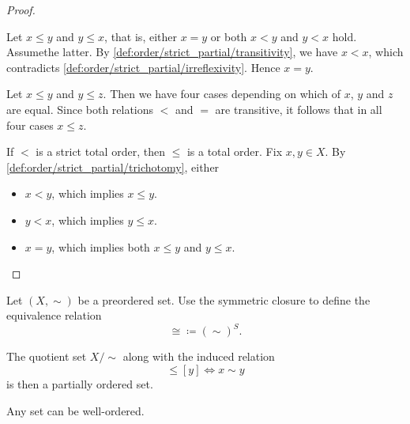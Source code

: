 \begin{proof}
\begin{description}
     Let \( x \leq y \) and \( y \leq x \), that is, either \( x = y \) or both \( x < y \) and \( y < x \) hold. Assume\LEM the latter. By \ref{def:order/strict_partial/transitivity}, we have \( x < x \), which contradicts \ref{def:order/strict_partial/irreflexivity}. Hence \( x = y \).

     Let \( x \leq y \) and \( y \leq z \). Then we have four cases depending on which of \( x \), \( y \) and \( z \) are equal. Since both relations \( < \) and \( = \) are transitive, it follows that in all four cases \( x \leq z \).

     If \( < \) is a strict total order, then \( \leq \) is a total order. Fix \( x, y \in X \). By \ref{def:order/strict_partial/trichotomy}, either
    \begin{itemize}
      \item \( x < y \), which implies \( x \leq y \).
      \item \( y < x \), which implies \( y \leq x \).
      \item \( x = y \), which implies both \( x \leq y \) and \( y \leq x \).
    \end{itemize}
  \end{description}
\end{proof}

\begin{proposition}\label{thm:preorder_to_partial_order}
  Let \( (X, \sim) \) be a preordered set. Use the symmetric closure to define the equivalence relation
  \begin{equation*}
    \cong \coloneqq (\sim)^S.
  \end{equation*}

  The quotient set \( X / \sim \) along with the induced relation
  \begin{equation*}
    [x] \leq [y] \iff x \sim y
  \end{equation*}
  is then a partially ordered set.
\end{proposition}

\begin{theorem}\label{thm:well_ordering_principle}\cite[196]{Enderton1977}
  Any set can be well-ordered.
\end{theorem}
